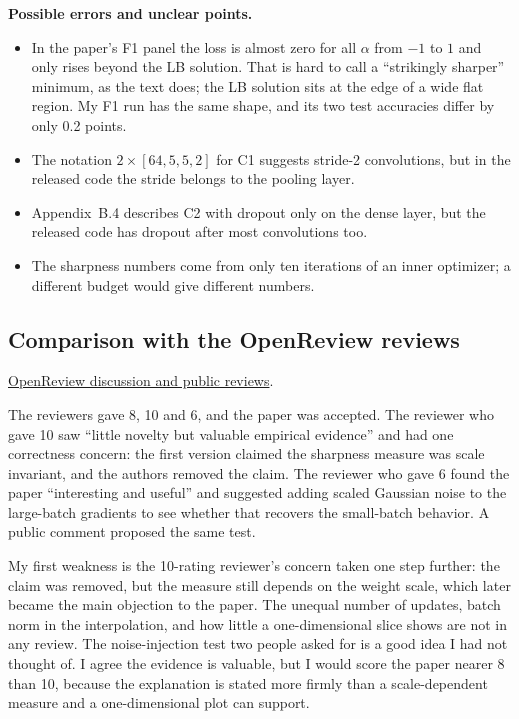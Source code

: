 \textbf{Possible errors and unclear points.}
\begin{itemize}
\item In the paper's F1 panel the loss is almost zero for all $\alpha$ from $-1$ to $1$ and only rises beyond the LB solution. That is hard to call a ``strikingly sharper'' minimum, as the text does; the LB solution sits at the edge of a wide flat region. My F1 run has the same shape, and its two test accuracies differ by only 0.2 points.
\item The notation $2\times[64,5,5,2]$ for C1 suggests stride-2 convolutions, but in the released code the stride belongs to the pooling layer.
\item Appendix~B.4 describes C2 with dropout only on the dense layer, but the released code has dropout after most convolutions too.
\item The sharpness numbers come from only ten iterations of an inner optimizer; a different budget would give different numbers.
\end{itemize}

\subsection{Comparison with the OpenReview reviews}
\noindent\href{https://openreview.net/forum?id=H1oyRlYgg}{OpenReview discussion and public reviews}.

The reviewers gave 8, 10 and 6, and the paper was accepted. The reviewer who gave 10 saw ``little novelty but valuable empirical evidence'' and had one correctness concern: the first version claimed the sharpness measure was scale invariant, and the authors removed the claim. The reviewer who gave 6 found the paper ``interesting and useful'' and suggested adding scaled Gaussian noise to the large-batch gradients to see whether that recovers the small-batch behavior. A public comment proposed the same test.

My first weakness is the 10-rating reviewer's concern taken one step further: the claim was removed, but the measure still depends on the weight scale, which later became the main objection to the paper. The unequal number of updates, batch norm in the interpolation, and how little a one-dimensional slice shows are not in any review. The noise-injection test two people asked for is a good idea I had not thought of. I agree the evidence is valuable, but I would score the paper nearer 8 than 10, because the explanation is stated more firmly than a scale-dependent measure and a one-dimensional plot can support.


